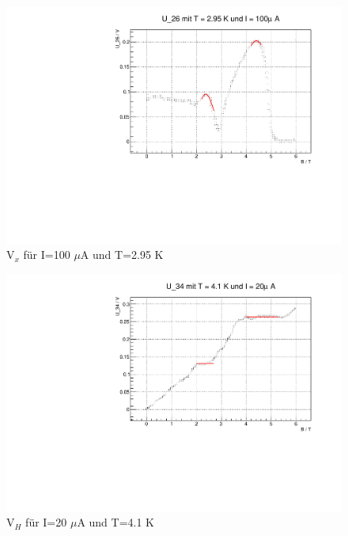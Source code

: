 
\begin{figure}
\label{}
\centering
\includegraphics[scale = 0.5]{../plots/U_26_100muA_2950mK.pdf}
\caption{$\text{V}_x$ für I=100 $\mu$A und T=2.95 K}
\end{figure}


\begin{figure}
\label{}
\centering
\includegraphics[scale = 0.5]{../plots/U_34_20muA_4100mK.pdf}
\caption{$\text{V}_H$ für I=20 $\mu$A und T=4.1 K}
\end{figure}

